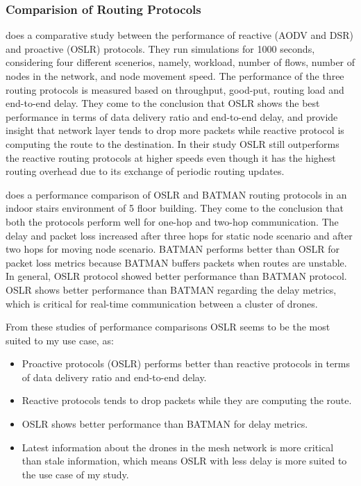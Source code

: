 \subsubsection{Comparision of Routing Protocols}

 does a comparative study between the performance of reactive (AODV and DSR) and proactive (OSLR) protocols. They run simulations for 1000 seconds, considering four different scenerios, namely, workload, number of flows, number of nodes in the network, and node movement speed. The performance of the three routing protocols is measured based on throughput, good-put, routing load and end-to-end delay. They come to the conclusion that OSLR shows the best performance in terms of data delivery ratio and end-to-end delay, and provide insight that network layer tends to drop more packets while reactive protocol is computing the route to the destination. In their study OSLR still outperforms the reactive routing protocols at higher speeds even though it has the highest routing overhead due to its exchange of periodic routing updates.

 does a performance comparison of OSLR and BATMAN routing protocols in an indoor stairs environment of 5 floor building. They come to the conclusion that both the protocols perform well for one-hop and two-hop communication. The delay and packet loss increased after three hops for static node scenario and after two hops for moving node scenario. BATMAN performs better than OSLR for packet loss metrics because BATMAN buffers packets when routes are unstable. In general, OSLR protocol showed better performance than BATMAN protocol. OSLR shows better performance than BATMAN regarding the delay metrics, which is critical for real-time communication between a cluster of drones.

From these studies of performance comparisons OSLR seems to be the most suited to my use case, as:
\begin{itemize}
	\item Proactive protocols (OSLR) performs better than reactive protocols in terms of data delivery ratio and end-to-end delay.
	\item Reactive protocols tends to drop packets while they are computing the route.
	\item OSLR shows better performance than BATMAN for delay metrics.
	\item Latest information about the drones in the mesh network is more critical than stale information, which means OSLR with less delay is more suited to the use case of my study.
\end{itemize}

